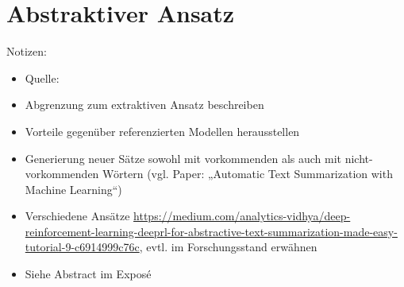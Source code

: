 \chapter{Abstraktiver Ansatz}
\thispagestyle{fancy}
\label{chap:Abstraktiver Ansatz}

Notizen:
\begin{itemize}
	\item Quelle: \cite{NIT19}
	\item Abgrenzung zum extraktiven Ansatz beschreiben
	\item Vorteile gegenüber referenzierten Modellen herausstellen
	\item Generierung neuer Sätze sowohl mit vorkommenden als auch mit nicht-vorkommenden Wörtern (vgl. Paper: „Automatic Text Summarization with Machine Learning“)
	\item Verschiedene Ansätze \url{https://medium.com/analytics-vidhya/deep-reinforcement-learning-deeprl-for-abstractive-text-summarization-made-easy-tutorial-9-c6914999c76c}, evtl. im Forschungsstand erwähnen
	\item Siehe Abstract im Exposé
\end{itemize}



